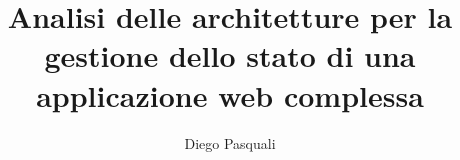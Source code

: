 \documentclass{report}
\author{Diego Pasquali}
\title{Analisi delle architetture per la gestione dello stato di una applicazione web complessa}
\begin{document}
    \maketitle
    \pagebreak

    \tableofcontents
    \pagebreak

    
    

     
    
\end{document}
